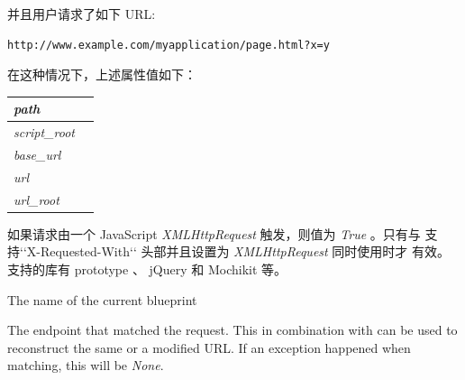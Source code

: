 \documentclass[a4paper,12pt]{sphinxmanual}
\begin{document}
\begin{fulllineitems}
\begin{fulllineitems}
并且用户请求了如下 URL:

\begin{Verbatim}[commandchars=\\\{\}]
http://www.example.com/myapplication/page.html?x=y
\end{Verbatim}

在这种情况下，上述属性值如下：

\begin{tabulary}{\linewidth}{|L|L|}
\hline

\emph{path}
 & 
\\\hline

\emph{script\_root}
 & 
\\\hline

\emph{base\_url}
 & 
\\\hline

\emph{url}
 & 
\\\hline

\emph{url\_root}
 & 
\\\hline
\end{tabulary}


\end{fulllineitems}


\begin{fulllineitems}
\label{api:flask.Request.is_xhr}
如果请求由一个 JavaScript \emph{XMLHttpRequest} 触发，则值为 \emph{True} 。只有与
支持{}`{}`X-Requested-With{}`{}` 头部并且设置为 \emph{XMLHttpRequest} 同时使用时才
有效。支持的库有 prototype 、 jQuery 和 Mochikit 等。

\end{fulllineitems}


\begin{fulllineitems}
\label{api:flask.Request.blueprint}
The name of the current blueprint

\end{fulllineitems}


\begin{fulllineitems}
\label{api:flask.Request.endpoint}
The endpoint that matched the request.  This in combination with
{\hyperref[api:flask.Request.view_args]{}} can be used to reconstruct the same or a
modified URL.  If an exception happened when matching, this will
be \emph{None}.


\end{fulllineitems}
\end{fulllineitems}
\end{document}
